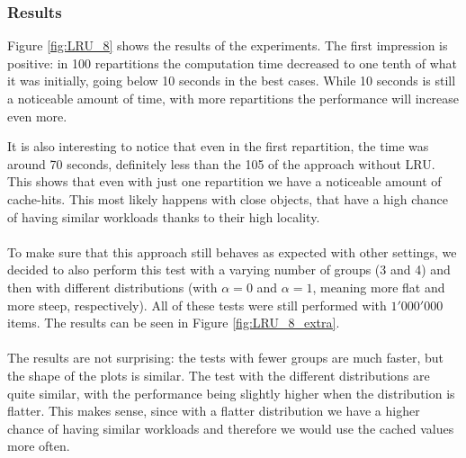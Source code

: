 \subsubsection{Results}
Figure \ref{fig:LRU_8} shows the results of the experiments. The first impression is positive: in 100 repartitions the computation time decreased to one tenth of what it was initially, going below 10 seconds in the best cases. While 10 seconds is still a noticeable amount of time, with more repartitions the performance will increase even more. 

It is also interesting to notice that even in the first repartition, the time was around 70 seconds, definitely less than the 105 of the approach without LRU. This shows that even with just one repartition we have a noticeable amount of cache-hits. This most likely happens with close objects, that have a high chance of having similar workloads thanks to their high locality.
\\\\
To make sure that this approach still behaves as expected with other settings, we decided to also perform this test with a varying number of groups (3 and 4) and then with different distributions (with $\alpha =0$ and $\alpha =1$, meaning more flat and more steep, respectively). All of these tests were still performed with $1'000'000$ items. The results can be seen in Figure \ref{fig:LRU_8_extra}.
\\\\
The results are not surprising: the tests with fewer groups are much faster, but the shape of the plots is similar. The test with the different distributions are quite similar, with the performance being slightly higher when the distribution is flatter. This makes sense, since with a flatter distribution we have a higher chance of having similar workloads and therefore we would use the cached values more often.

